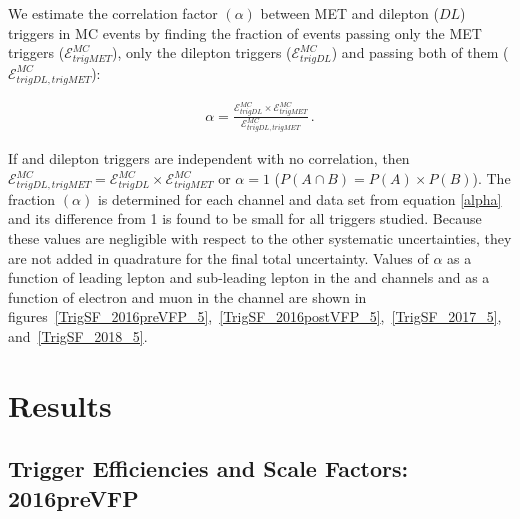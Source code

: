 We estimate the correlation factor $(\alpha)$ between MET and dilepton ($DL$) triggers in \ttbar MC events by finding the fraction of events passing only the MET triggers ($\mathcal{E}_{trigMET}^{MC}$), only the dilepton triggers ($\mathcal{E}_{trigDL}^{MC}$) and passing both of them ($\mathcal{E}_{trigDL,trigMET}^{MC}$): 
\begin{linenomath*}
\begin{align}
\alpha=\frac{\mathcal{E}_{trigDL}^{MC} \times \mathcal{E}_{trigMET}^{MC}}{\mathcal{E}_{trigDL,trigMET}^{MC}} \, .
\label{alpha}
\end{align}
\end{linenomath*}
If \MET and dilepton triggers are independent with no correlation, then $\mathcal{E}_{trigDL,trigMET}^{MC} = \mathcal{E}_{trigDL}^{MC} \times \mathcal{E}_{trigMET}^{MC}$ or $\alpha = 1$ ($P(A \cap B) = P(A) \times P(B)$).
The fraction $(\alpha)$ is determined for each channel and data set from equation \ref{alpha} and its difference from 1 is found to be small for all triggers studied. 
Because these values are negligible with respect to the other systematic uncertainties, they are not added in quadrature for the final total uncertainty. 
Values of $\alpha$ as a function of leading lepton \pT and sub-leading lepton \pT in the \ee and \mumu channels and as a function of electron \pT and muon \pT in the \emu channel are shown in figures~\ref{TrigSF_2016preVFP_5},~\ref{TrigSF_2016postVFP_5},~\ref{TrigSF_2017_5}, and~\ref{TrigSF_2018_5}. 

\section{Results}

\subsection{Trigger Efficiencies and Scale Factors: 2016preVFP}
\label{TrigSFResults2016preVFP}

